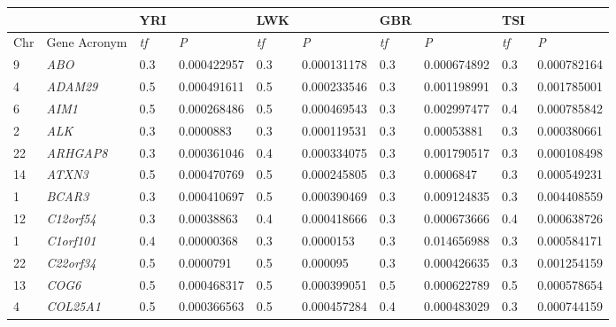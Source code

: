 \begin{refsection}
\begin{otherlanguage}{english}
\begin{scriptsize}
\begin{longtable}{llllllllll}
\toprule
\cellcolor[HTML]{EFEFEF} & \cellcolor[HTML]{EFEFEF}\textit{} & \cellcolor[HTML]{EFEFEF}YRI & \cellcolor[HTML]{EFEFEF} & \cellcolor[HTML]{EFEFEF}LWK & \cellcolor[HTML]{EFEFEF} & \cellcolor[HTML]{EFEFEF}GBR & \cellcolor[HTML]{EFEFEF} & \cellcolor[HTML]{EFEFEF}TSI & \cellcolor[HTML]{EFEFEF} \\ \midrule
Chr & Gene Acronym & \textit{tf} & \textit{P} & \textit{tf} & \textit{P} & \textit{tf} & \textit{P} & \textit{tf} & \textit{P} \\
9 & \cellcolor[HTML]{CBCEFB}\textit{ABO} & 0.3 & 0.000422957 & 0.3 & 0.000131178 & 0.3 & 0.000674892 & 0.3 & 0.000782164 \\
4 & \cellcolor[HTML]{CBCEFB}\textit{ADAM29} & 0.5 & 0.000491611 & 0.5 & 0.000233546 & 0.3 & 0.001198991 & 0.3 & 0.001785001 \\
6 & \cellcolor[HTML]{CBCEFB}\textit{AIM1} & 0.5 & 0.000268486 & 0.5 & 0.000469543 & 0.3 & 0.002997477 & 0.4 & 0.000785842 \\
2 & \cellcolor[HTML]{CBCEFB}\textit{ALK} & 0.3 & 0.0000883 & 0.3 & 0.000119531 & 0.3 & 0.00053881 & 0.3 & \cellcolor[HTML]{CBCEFB}0.000380661 \\
22 & \cellcolor[HTML]{CBCEFB}\textit{ARHGAP8} & 0.3 & 0.000361046 & 0.4 & 0.000334075 & 0.3 & 0.001790517 & 0.3 & \cellcolor[HTML]{CBCEFB}0.000108498 \\
14 & \cellcolor[HTML]{CBCEFB}\textit{ATXN3} & 0.5 & 0.000470769 & 0.5 & 0.000245805 & 0.3 & 0.0006847 & 0.3 & 0.000549231 \\
1 & \cellcolor[HTML]{CBCEFB}\textit{BCAR3} & 0.3 & 0.000410697 & 0.5 & 0.000390469 & 0.3 & 0.009124835 & 0.3 & 0.004408559 \\
12 & \cellcolor[HTML]{CBCEFB}\textit{C12orf54} & 0.3 & 0.00038863 & 0.4 & 0.000418666 & 0.3 & 0.000673666 & 0.4 & 0.000638726 \\
1 & \cellcolor[HTML]{CBCEFB}\textit{C1orf101} & 0.4 & 0.00000368 & 0.3 & 0.0000153 & 0.3 & 0.014656988 & 0.3 & 0.000584171 \\
22 & \cellcolor[HTML]{CBCEFB}\textit{C22orf34} & 0.5 & 0.0000791 & 0.5 & 0.000095 & 0.3 & \cellcolor[HTML]{CBCEFB}0.000426635 & 0.3 & 0.001254159 \\
13 & \cellcolor[HTML]{CBCEFB}\textit{COG6} & 0.5 & 0.000468317 & 0.5 & 0.000399051 & 0.5 & 0.000622789 & 0.5 & 0.000578654 \\
4 & \cellcolor[HTML]{CBCEFB}\textit{COL25A1} & 0.5 & 0.000366563 & 0.5 & 0.000457284 & 0.4 & \cellcolor[HTML]{CBCEFB}0.000483029 & 0.3 & 0.000744159 \\

\end{longtable}
\end{scriptsize}
\end{otherlanguage}
\end{refsection}
